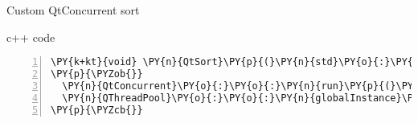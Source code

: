 \documentclass{beamer}
\begin{document}
\begin{frame}[fragile]{Custom QtConcurrent sort}
\begin{block}{c++ code}
\begin{Verbatim}[commandchars=\\\{\},numbers=left,firstnumber=1,stepnumber=1]
\PY{k+kt}{void} \PY{n}{QtSort}\PY{p}{(}\PY{n}{std}\PY{o}{:}\PY{o}{:}\PY{n}{vector}\PY{o}{<}\PY{k+kt}{float}\PY{o}{>}\PY{o}{&} \PY{n}{data}\PY{p}{)}
\PY{p}{\PYZob{}}
  \PY{n}{QtConcurrent}\PY{o}{:}\PY{o}{:}\PY{n}{run}\PY{p}{(}\PY{n}{QuickSortTask}\PY{o}{<}\PY{k+kt}{float}\PY{o}{>}\PY{p}{,} \PY{n}{data}\PY{p}{.}\PY{n}{data}\PY{p}{(}\PY{p}{)}\PY{p}{,} \PY{l+m+mi}{0}\PY{p}{,} \PY{n}{data}\PY{p}{.}\PY{n}{size}\PY{p}{(}\PY{p}{)} \PY{o}{-} \PY{l+m+mi}{1}\PY{p}{,} \PY{l+m+mi}{6}\PY{p}{)}\PY{p}{;}
  \PY{n}{QThreadPool}\PY{o}{:}\PY{o}{:}\PY{n}{globalInstance}\PY{p}{(}\PY{p}{)}\PY{o}{-}\PY{o}{>}\PY{n}{waitForDone}\PY{p}{(}\PY{p}{)}\PY{p}{;}
\PY{p}{\PYZcb{}}
\end{Verbatim}

\end{block}

\end{frame}

\end{document}
